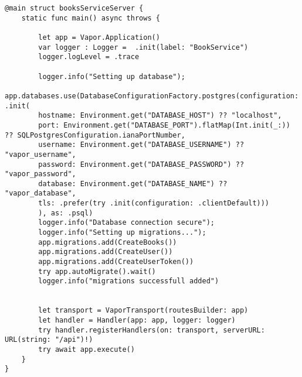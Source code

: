 \begin{lstlisting}[caption=booksServiceServer file]
@main struct booksServiceServer {
    static func main() async throws {
        
        let app = Vapor.Application()
        var logger : Logger =  .init(label: "BookService")
        logger.logLevel = .trace
        
        logger.info("Setting up database");
        app.databases.use(DatabaseConfigurationFactory.postgres(configuration: .init(
        hostname: Environment.get("DATABASE_HOST") ?? "localhost",
        port: Environment.get("DATABASE_PORT").flatMap(Int.init(_:)) ?? SQLPostgresConfiguration.ianaPortNumber,
        username: Environment.get("DATABASE_USERNAME") ?? "vapor_username",
        password: Environment.get("DATABASE_PASSWORD") ?? "vapor_password",
        database: Environment.get("DATABASE_NAME") ?? "vapor_database",
        tls: .prefer(try .init(configuration: .clientDefault)))
        ), as: .psql)
        logger.info("Database connection secure");
        logger.info("Setting up migrations...");
        app.migrations.add(CreateBooks())
        app.migrations.add(CreateUser())
        app.migrations.add(CreateUserToken())
        try app.autoMigrate().wait()
        logger.info("migrations successfull added")
        
        
        let transport = VaporTransport(routesBuilder: app)
        let handler = Handler(app: app, logger: logger)
        try handler.registerHandlers(on: transport, serverURL: URL(string: "/api")!)
        try await app.execute()
    }
}

\end{lstlisting}

